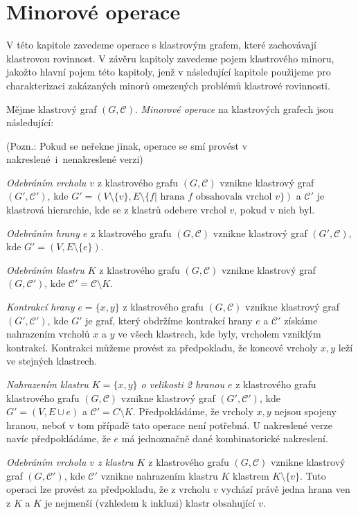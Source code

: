 \chapter{Minorové operace}

V této kapitole zavedeme operace s klastrovým grafem, které zachovávají klastrovou rovinnost. V závěru kapitoly zavedeme pojem klastrového minoru, jakožto hlavní pojem této kapitoly, jenž v následující kapitole použijeme pro charakterizaci zakázaných minorů omezených problémů klastrové rovinnosti.

\begin{defn}Mějme klastrový graf $(G, \mathcal C)$. \textit{Minorové operace} na klastrových grafech jsou následující:

(Pozn.: Pokud se neřekne jinak, operace se smí provést v nakreslené~i~nenakreslené verzi)

\textit{Odebráním vrcholu $v$} z klastrového grafu $(G, \mathcal C)$ vznikne klastrový graf  $(G', \mathcal C')$, kde  $G' = (V \setminus \{v\}, E \setminus \{f | \text{ hrana } f \text{ obsahovala vrchol } v\})$ a $\mathcal C'$ je klastrová hierarchie, kde se z klastrů odebere vrchol $v$, pokud v nich byl.

\textit{Odebráním hrany $e$} z klastrového grafu $(G, \mathcal C)$ vznikne klastrový graf  $(G', \mathcal C)$, kde $G' =  (V,E \setminus \{e\})$.

\textit{Odebráním klastru $K$} z klastrového grafu $(G, \mathcal C)$ vznikne klastrový graf  $(G, \mathcal C')$, kde $\mathcal C' = \mathcal C \setminus K$.

\textit{Kontrakcí hrany $e=\{x,y\}$} z klastrového grafu $(G, \mathcal C)$ vznikne klastrový graf  $(G', \mathcal C')$, kde $G'$ je graf, který obdržíme kontrakcí hrany $e$ a $\mathcal C'$ získáme nahrazením vrcholů $x$ a $y$ ve všech klastrech, kde byly, vrcholem vzniklým kontrakcí. Kontrakci můžeme provést za předpokladu, že koncové vrcholy $x, y$ leží ve stejných klastrech.

\textit{Nahrazením klastru $K=\{x,y\}$ o velikosti 2 hranou $e$} z klastrového grafu klastrového grafu $(G, \mathcal C)$ vznikne klastrový graf  $(G', \mathcal C')$, kde $G'=(V,E \cup e)$ a $\mathcal C'= C \setminus K$. Předpokládáme, že vrcholy $x, y$ nejsou spojeny hranou, neboť v tom případě tato operace není potřebná. U nakreslené verze navíc předpokládáme, že $e$ má jednoznačně dané kombinatorické nakreslení.

\textit{Odebráním vrcholu $v$ z klastru $K$} z klastrového grafu $(G, \mathcal C)$ vznikne klastrový graf  $(G, \mathcal C')$, kde $\mathcal C'$ vznikne nahrazením klastru $K$ klastrem $K \setminus \{v\}$. Tuto operaci lze provést za předpokladu, že z vrcholu $v$ vychází právě jedna hrana ven z $K$ a $K$ je nejmenší (vzhledem k inkluzi) klastr obsahující $v$.


\end{defn}
